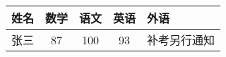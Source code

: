 \documentclass{article}
\begin{document}
	\begin{tabular}{l||c|c|c|p{1.5cm}|}
	    \hline
		姓名 & 数学 & 语文 & 英语 &外语 \\
		\hline  \hline
		张三 & 87  & 100 & 93 & 补考另行通知 \\	
		\hline
	\end{tabular}		
\end{document}
